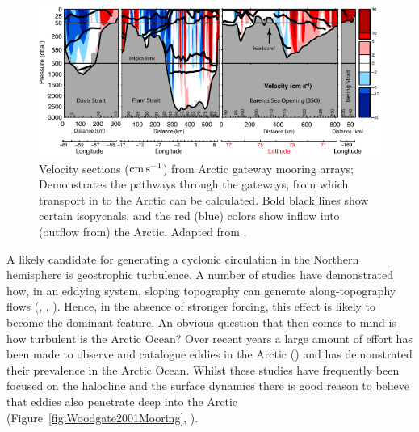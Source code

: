 \documentclass[10pt,a4paper]{article}
\begin{document}
\begin{figure}
	\centering
	\includegraphics[width=\linewidth]{Tsubouchi2012Transport}
	\caption[Adapted from \cite{tsubouchi2012arctic}]{Velocity
		sections (${\rm cm} \, {\rm s}^{-1}$) from Arctic gateway mooring arrays;
		Demonstrates the pathways through the gateways, from which transport 
		in to the Arctic can be calculated.
		Bold black lines show certain isopycnals, and the red (blue) colors show inflow
		into (outflow from) the Arctic.  Adapted from \cite{tsubouchi2012arctic}.}
	\label{fig:Tsubouchi2012Transport}
\end{figure}

A likely candidate for generating a cyclonic circulation in the Northern hemisphere is
geostrophic turbulence. A number of studies have demonstrated how, in an eddying system, 
sloping topography can generate along-topography flows (\cite{treguier1989topographically}, \cite{adcock2000interactions}, \cite{nost2008asymmetry}). Hence, in the absence of stronger
forcing, this effect is likely to become the dominant feature. An obvious question that then
comes to mind is how turbulent is the Arctic Ocean? Over recent years a large amount  of 
effort has been made to observe and catalogue eddies in the Arctic
(\cite{zhao2014characterizing}) and has demonstrated their prevalence in the Arctic Ocean.
Whilst these studies have frequently been focused on the halocline and the surface dynamics
there is good reason to believe that eddies also penetrate deep into the Arctic 
(Figure~\ref{fig:Woodgate2001Mooring}, \cite{woodgate2001arctic}).
\end{document}
